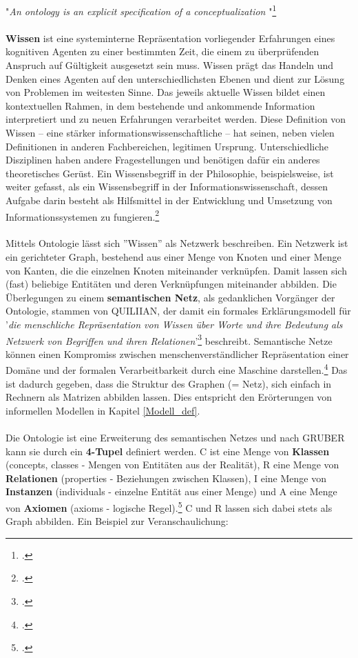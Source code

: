 \documentclass[12pt,a4paper]{article}
\begin{document}
"\textit{An ontology is an explicit specification of a conceptualization}
"\footcite[][S.69]{hoekstra2009ontology}
\\
\\
\textbf{Wissen} ist eine systeminterne Repräsentation vorliegender Erfahrungen eines kognitiven Agenten zu einer bestimmten Zeit, die einem zu überprüfenden Anspruch auf Gültigkeit ausgesetzt sein muss. Wissen prägt das Handeln und Denken eines Agenten auf den unterschiedlichsten Ebenen und dient zur Lösung von Problemen im weitesten Sinne. Das jeweils aktuelle Wissen bildet einen kontextuellen Rahmen, in dem bestehende und ankommende Information interpretiert und zu neuen Erfahrungen verarbeitet werden. Diese Definition von Wissen -- eine stärker informationswissenschaftliche -- hat seinen, neben vielen Definitionen in anderen Fachbereichen, legitimen Ursprung. Unterschiedliche Disziplinen haben andere Fragestellungen und benötigen dafür ein anderes theoretisches Gerüst. Ein Wissensbegriff in der Philosophie, beispielsweise, ist weiter gefasst, als ein Wissensbegriff in der Informationswissenschaft, dessen Aufgabe darin besteht als Hilfsmittel in der Entwicklung und Umsetzung von Informationssystemen zu fungieren.\footcite{favre2001information} 
\\
\\
Mittels Ontologie lässt sich ''Wissen'' als Netzwerk beschreiben. Ein Netzwerk ist ein gerichteter Graph, bestehend aus einer Menge von Knoten und einer Menge von Kanten, die die einzelnen Knoten miteinander verknüpfen. Damit lassen sich (fast) beliebige Entitäten und deren Verknüpfungen miteinander abbilden. Die Überlegungen zu einem \textbf{semantischen Netz}, als gedanklichen Vorgänger der Ontologie, stammen von QUILIIAN, der damit ein formales Erklärungsmodell für '\textit{die menschliche Repräsentation von Wissen über Worte und ihre Bedeutung als Netzwerk von Begriffen und ihren Relationen}'\footcite{stuckenschmidt2009ontologien} beschreibt. Semantische Netze können einen Kompromiss zwischen menschenverständlicher Repräsentation einer Domäne  und der formalen Verarbeitbarkeit durch eine Maschine darstellen.\footcite{reichenberger2010grundlagen} Das ist dadurch gegeben, dass die Struktur des Graphen (= Netz), sich einfach in Rechnern als Matrizen abbilden lassen. Dies entspricht den Erörterungen von informellen Modellen in Kapitel \ref{Modell_def}.
\\
\\
Die Ontologie ist eine Erweiterung des semantischen Netzes und nach GRUBER kann sie durch ein \textbf{4-Tupel} definiert werden. C ist eine Menge von \textbf{Klassen} (concepts, classes - Mengen von Entitäten aus der Realität), R eine Menge von \textbf{Relationen} (properties - Beziehungen zwischen Klassen), I eine Menge von \textbf{Instanzen} (individuals - einzelne Entität aus einer Menge) und A eine Menge von \textbf{Axiomen} (axioms - logische Regel).\footcite{joostbreukera2009flood} C und R lassen sich dabei stets als Graph abbilden. Ein Beispiel zur Veranschaulichung: 
\end{document}
